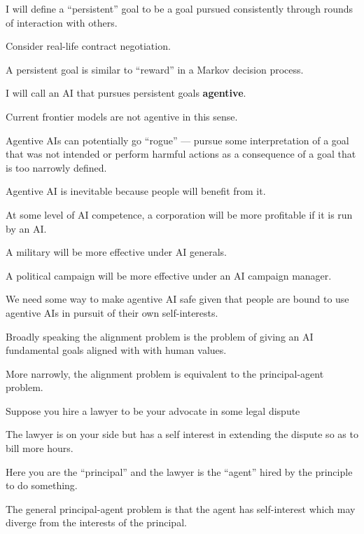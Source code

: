 {

I will define a ``persistent'' goal to be a goal pursued consistently through rounds of interaction with others.

\vfill
Consider real-life contract negotiation.

\vfill
A persistent goal is similar to ``reward'' in a Markov decision process.


I will call an AI that pursues persistent goals {\bf agentive}.

\vfill
Current frontier models are not agentive in this sense.

\vfill
Agentive AIs can potentially go ``rogue'' --- pursue some interpretation of a goal that was not intended or perform harmful actions as a consequence of a goal that is too narrowly defined.


Agentive AI is inevitable because people will benefit from it.

\vfill
At some level of AI competence, a corporation will be more profitable if it is run by an AI.

\vfill
A military will be more effective under AI generals.

\vfill
A political campaign will be more effective under an AI campaign manager.

\vfill
We need some way to make agentive AI safe given that people are bound to use agentive AIs in pursuit of their own self-interests.


Broadly speaking the alignment problem is the problem of giving an AI fundamental goals aligned with with human values.

\vfill
More narrowly, the alignment problem is equivalent to the principal-agent problem.


Suppose you hire a lawyer to be your advocate in some legal dispute

\vfill
The lawyer is on your side but has a self interest in extending the dispute so as to bill more hours.

\vfill
Here you are the ``principal'' and the lawyer is the ``agent'' hired by the principle to do something.

\vfill
The general principal-agent problem is that the agent has self-interest which may diverge from the interests of the principal.


}
